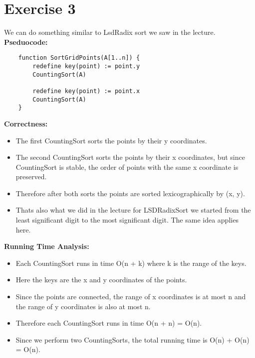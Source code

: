 \documentclass{article}
\begin{document}

\section*{Exercise 3}
We can do something similar to LsdRadix sort we saw in the lecture. \\
\textbf{Pseduocode:}
\begin{verbatim}
    function SortGridPoints(A[1..n]) {
        redefine key(point) := point.y
        CountingSort(A)

        redefine key(point) := point.x
        CountingSort(A)
    }
\end{verbatim}

\textbf{Correctness:}
\begin{itemize}
    \item The first CountingSort sorts the points by their y coordinates.
    \item The second CountingSort sorts the points by their x coordinates, but since CountingSort is stable, the order of points with the same x coordinate is preserved.
    \item Therefore after both sorts the points are sorted lexicographically by (x, y).
    \item Thats also what we did in the lecture for LSDRadixSort we started from the least significant digit to the most significant digit. The same idea applies here.
\end{itemize}

\textbf{Running Time Analysis:}
\begin{itemize}
    \item Each CountingSort runs in time O(n + k) where k is the range of the keys.
    \item Here the keys are the x and y coordinates of the points.
    \item Since the points are connected, the range of x coordinates is at most n and the range of y coordinates is also at most n.
    \item Therefore each CountingSort runs in time O(n + n) = O(n).
    \item Since we perform two CountingSorts, the total running time is O(n) + O(n) = O(n).
\end{itemize}
\end{document}
